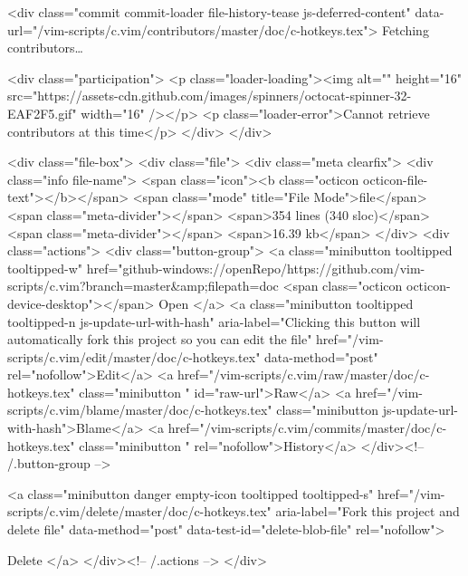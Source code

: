   <div class="commit commit-loader file-history-tease js-deferred-content" data-url="/vim-scripts/c.vim/contributors/master/doc/c-hotkeys.tex">
    Fetching contributors…

    <div class="participation">
      <p class="loader-loading"><img alt="" height="16" src="https://assets-cdn.github.com/images/spinners/octocat-spinner-32-EAF2F5.gif" width="16" /></p>
      <p class="loader-error">Cannot retrieve contributors at this time</p>
    </div>
  </div>

<div class="file-box">
  <div class="file">
    <div class="meta clearfix">
      <div class="info file-name">
        <span class="icon"><b class="octicon octicon-file-text"></b></span>
        <span class="mode" title="File Mode">file</span>
        <span class="meta-divider"></span>
          <span>354 lines (340 sloc)</span>
          <span class="meta-divider"></span>
        <span>16.39 kb</span>
      </div>
      <div class="actions">
        <div class="button-group">
            <a class="minibutton tooltipped tooltipped-w"
               href="github-windows://openRepo/https://github.com/vim-scripts/c.vim?branch=master&amp;filepath=doc%
                <span class="octicon octicon-device-desktop"></span> Open
            </a>
                <a class="minibutton tooltipped tooltipped-n js-update-url-with-hash"
                   aria-label="Clicking this button will automatically fork this project so you can edit the file"
                   href="/vim-scripts/c.vim/edit/master/doc/c-hotkeys.tex"
                   data-method="post" rel="nofollow">Edit</a>
          <a href="/vim-scripts/c.vim/raw/master/doc/c-hotkeys.tex" class="minibutton " id="raw-url">Raw</a>
            <a href="/vim-scripts/c.vim/blame/master/doc/c-hotkeys.tex" class="minibutton js-update-url-with-hash">Blame</a>
          <a href="/vim-scripts/c.vim/commits/master/doc/c-hotkeys.tex" class="minibutton " rel="nofollow">History</a>
        </div><!-- /.button-group -->

            <a class="minibutton danger empty-icon tooltipped tooltipped-s"
               href="/vim-scripts/c.vim/delete/master/doc/c-hotkeys.tex"
               aria-label="Fork this project and delete file"
               data-method="post" data-test-id="delete-blob-file" rel="nofollow">

          Delete
        </a>
      </div><!-- /.actions -->
    </div>
      
